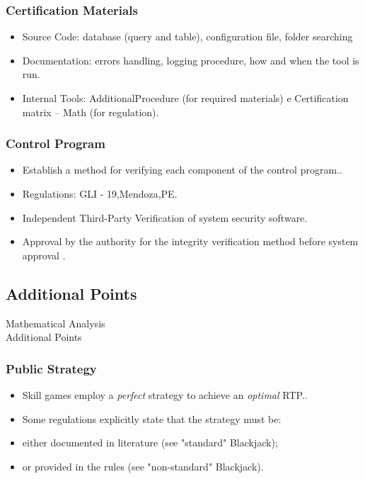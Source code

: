 \documentclass{beamer}
\begin{document}
\begin{frame}
\frametitle{Certification Materials}
\begin{itemize}
\item<1-> Source Code: database (query and table), configuration file, folder searching
\item<2-> Documentation: errors handling, logging procedure, how and when the tool is run.
\item<3-> Internal Tools: AdditionalProcedure (for required materials) e Certification matrix -- Math (for regulation).

\end{itemize}
\end{frame}

\begin{frame}
\frametitle{Control Program}
\begin{itemize}
\item<1-> Establish a method for verifying each component of the control program..
\item<2-> Regulations: GLI - 19,Mendoza,PE.
\item<3-> Independent Third-Party Verification of system security software.
\item<4-> Approval by the authority for the integrity verification method before system approval .
\end{itemize}
\end{frame}

\begin{frame}
\section{Additional Points}
\centering \Large Mathematical Analysis \\ \large Additional Points
\end{frame}

\begin{frame}
\frametitle{Public Strategy}
\begin{itemize}
\item<1-> Skill games employ a \emph{perfect} strategy to achieve an \emph{optimal} RTP..
\item<2-> Some regulations explicitly state that the strategy must be:
\item<3-> either documented in literature (see "standard" Blackjack);
\item<4-> or provided in the rules (see "non-standard" Blackjack).
\end{itemize}
\end{frame}
\end{document}
